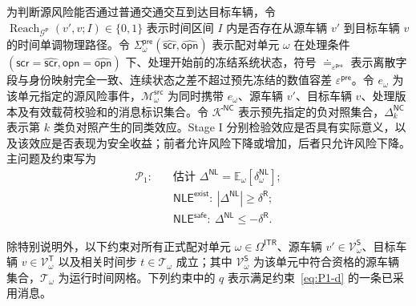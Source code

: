 \documentclass[10pt,a4paper,twocolumn]{article}
\begin{document}
为判断源风险能否通过普通交通交互到达目标车辆，令 $\operatorname{Reach}_{\mathcal G^{\mathsf P}}(v',v;I)\in\{0,1\}$ 表示时间区间 $I$ 内是否存在从源车辆 $v'$ 到目标车辆 $v$ 的时间单调物理路径。令 $\Sigma_{\omega}^{\mathsf{pre}}(\hat{\mathsf{scr}},\hat{\mathsf{opn}})$ 表示配对单元 $\omega$ 在处理条件 $(\mathsf{scr}=\hat{\mathsf{scr}},\mathsf{opn}=\hat{\mathsf{opn}})$ 下、处理开始前的冻结系统状态，符号 $\doteq_{\varepsilon^{\mathsf{pre}}}$ 表示离散字段与身份映射完全一致、连续状态之差不超过预先冻结的数值容差 $\varepsilon^{\mathsf{pre}}$。令 $e_\omega$ 为该单元指定的源风险事件，$\mathcal M_{\omega}^{\mathsf{src}}$ 为同时携带 $e_\omega$、源车辆 $v'$、目标车辆 $v$、处理版本及有效载荷校验和的消息标识集合。令 $\mathcal K^{\mathsf{NC}}$ 表示预先指定的负对照集合，$\Delta_{k}^{\mathsf{NC}}$ 表示第 $k$ 类负对照产生的同类效应。Stage I 分别检验效应是否具有实际意义，以及该效应是否表现为安全收益；前者允许风险下降或增加，后者只允许风险下降。主问题及约束写为
\begin{equation}\label{eq:P1}
\begin{aligned}
\mathcal P_1:\quad
&\text{估计 }\Delta^{\mathsf{NL}}=\mathbb E_\omega[\delta_\omega^{\mathsf{NL}}];\\
&\mathsf{NLE}^{\mathsf{exist}}:\ |\Delta^{\mathsf{NL}}|\geq\delta^{\mathsf R};\\
&\mathsf{NLE}^{\mathsf{safe}}:\ \Delta^{\mathsf{NL}}\leq-\delta^{\mathsf R}.
\end{aligned}
\end{equation}
\addtocounter{equation}{-1}
除特别说明外，以下约束对所有正式配对单元 $\omega\in\Omega^{\mathsf{ITR}}$、源车辆 $v'\in\mathcal V^{\mathsf S}_{\omega}$、目标车辆 $v\in\mathcal V^{\mathsf T}_{\omega}$ 以及相关时间步 $t\in\mathcal T_{\omega}$ 成立；其中 $\mathcal V^{\mathsf S}_{\omega}$ 为该单元中符合资格的源车辆集合，$\mathcal T_{\omega}$ 为运行时间网格。下列约束中的 $q$ 表示满足约束~\eqref{eq:P1-d} 的一条已采用消息。
\end{document}
